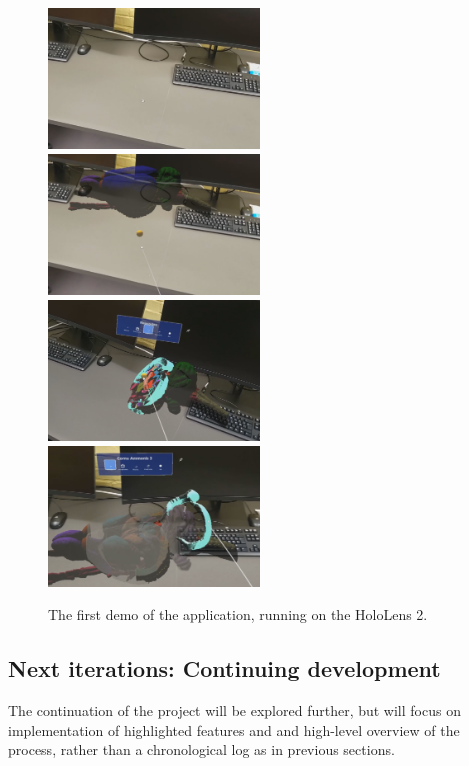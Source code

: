 \begin{figure}[h]
    \includegraphics[width=0.5\textwidth]{fig/mvpdemo1.png}
    \includegraphics[width=0.5\textwidth]{fig/mvpdemo2.png}
    \includegraphics[width=0.5\textwidth]{fig/mvpdemo3.png}
    \includegraphics[width=0.5\textwidth]{fig/mvpdemo4.png}
    \caption{The first demo of the application, running on the HoloLens 2.}
    \label{fig:mvpdemo}
\end{figure}

\subsection[Iteration N]{Next iterations: Continuing development}

The continuation of the project will be explored further, but will focus on implementation of highlighted features and and high-level overview of the process, rather than a chronological log as in previous sections. 

